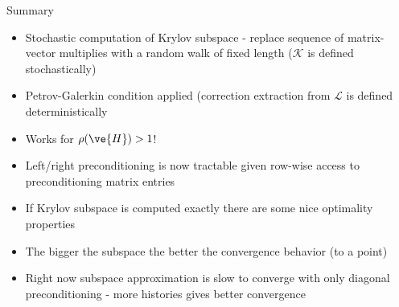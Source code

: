 \documentclass{beamer}
\begin{document}
\begin{frame}{Summary}

  \begin{itemize}
  \item Stochastic computation of Krylov subspace - replace sequence
    of matrix-vector multiplies with a random walk of fixed length
    ($\mathcal{K}$ is defined stochastically)
  \item Petrov-Galerkin condition applied (correction extraction from
    $\mathcal{L}$ is defined deterministically
  \item Works for $\rho(\ve{H}) > 1$!
  \item Left/right preconditioning is now tractable given row-wise
    access to preconditioning matrix entries
  \item If Krylov subspace is computed exactly there are some nice
    optimality properties
  \item The bigger the subspace the better the convergence behavior
    (to a point)
  \item Right now subspace approximation is slow to converge with only
    diagonal preconditioning - more histories gives better convergence
  \end{itemize}

\end{frame}

\end{document}
